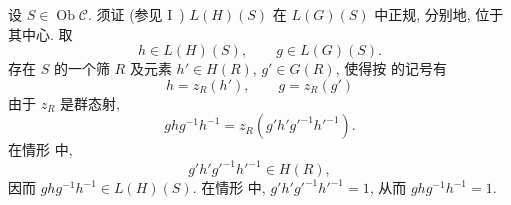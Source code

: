设 \(S\in\operatorname{Ob}\mathscr C\).
须证 (参见 I~)
\(L(H)(S)\) 在 \(L(G)(S)\) 中正规, 分别地, 位于其中心. 取
\[
  h\in L(H)(S),\qquad g\in L(G)(S).
\]
存在 \(S\) 的一个筛 \(R\) 及元素 \(h'\in H(R)\),
\(g'\in G(R)\), 使得按  的记号有
\[
  h=z_R(h'),\qquad g=z_R(g')
\]
由于 \(z_R\) 是群态射,
\[
  ghg^{-1}h^{-1}=z_R(g'h'g'^{-1}h'^{-1}).
\]
在情形  中,
\[
  g'h'g'^{-1}h'^{-1}\in H(R),
\]
因而 \(ghg^{-1}h^{-1}\in L(H)(S)\).
在情形  中,
\(g'h'g'^{-1}h'^{-1}=1\), 从而 \(ghg^{-1}h^{-1}=1\).

